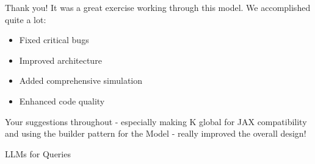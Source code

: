 \begin{frame}
    
  Thank you! It was a great exercise working through this model. We accomplished quite a lot:

  \begin{itemize}
      \item Fixed critical bugs 
      \item Improved architecture 
      \item Added comprehensive simulation 
      \item Enhanced code quality 
  \end{itemize}

  Your suggestions throughout - especially making K global for JAX compatibility and using the builder pattern for
  the Model - really improved the overall design!

\end{frame}

\begin{frame}{LLMs for Queries}
    
    \begin{figure}
       \centering
    \end{figure}

\end{frame}


\begin{frame}
    
    \begin{figure}
       \centering
    \end{figure}

\end{frame}


